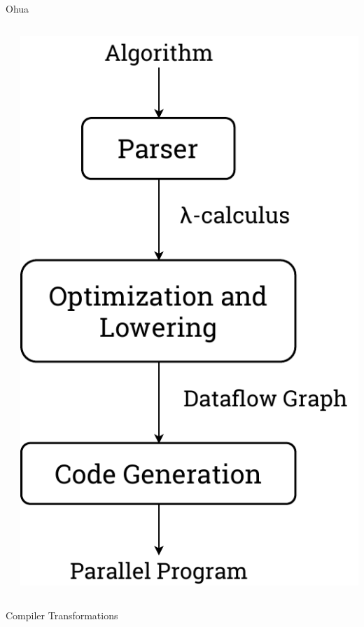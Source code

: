 \documentclass[aspectratio=169, usenames, dvipsnames]{beamer}
\begin{document}
\begin{frame}{Ohua\footnotemark[2]}
\begin{columns}
\begin{column}{0.7\textwidth}
    \end{column}
    \begin{column}{0.25\textwidth}
      \includegraphics[width=\textwidth,height=\textheight,keepaspectratio]{img/ohua}
    \end{column}
  \end{columns}

\end{frame}

\begin{frame}{Compiler Transformations}
\end{frame}
\end{document}
